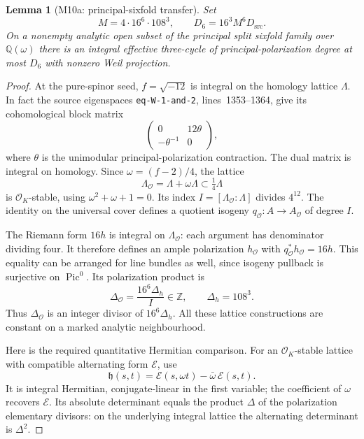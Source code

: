 \documentclass[11pt,a4paper]{article}
\newtheorem{lemma}[theorem]{Lemma}
\theoremstyle{definition}\newtheorem{definition}[theorem]{Definition}
\theoremstyle{remark}\newtheorem{remark}[theorem]{Remark}
\newcommand{\Q}{\mathbb Q}\newcommand{\Z}{\mathbb Z}\newcommand{\C}{\mathbb C}\newcommand{\R}{\mathbb R}
\newcommand{\cO}{\mathcal O}\newcommand{\CH}{\operatorname{CH}}\newcommand{\cl}{\operatorname{cl}}
\begin{document}
\begin{lemma}[M10a: principal-sixfold transfer]\label{M10a}
Set
\[
 M=4\cdot16^6\cdot108^3,\qquad
 D_6=16^3M^6D_{\mathrm{src}}.
\]
On a nonempty analytic open subset of the principal split sixfold
family over $\Q(\omega)$ there is an integral effective three-cycle
of principal-polarization degree at most $D_6$ with nonzero Weil
projection.
\end{lemma}
\begin{proof}
At the pure-spinor seed, $f=\sqrt{-12}$ is integral on the homology
lattice $\Lambda$. In fact the source eigenspaces
\texttt{eq-W-1-and-2}, lines~1353--1364, give its cohomological
block matrix
\[
 \begin{pmatrix}0&12\theta\\-\theta^{-1}&0\end{pmatrix},
\]
where $\theta$ is the unimodular principal-polarization contraction.
The dual matrix is integral on homology. Since
$\omega=(f-2)/4$, the lattice
\[
 \Lambda_{\cO}=\Lambda+\omega\Lambda
 \subset\tfrac14\Lambda
\]
is $\cO_K$-stable, using $\omega^2+\omega+1=0$.
Its index $I=[\Lambda_{\cO}:\Lambda]$ divides $4^{12}$.
The identity on the universal cover defines a quotient isogeny
$q_{\cO}:A\to A_{\cO}$ of degree $I$.

The Riemann form $16h$ is integral on $\Lambda_{\cO}$: each argument
has denominator dividing four. It therefore defines an ample
polarization $h_{\cO}$ with
$q_{\cO}^*h_{\cO}=16h$. This equality can be arranged for line
bundles as well, since isogeny pullback is surjective on
$\operatorname{Pic}^0$. Its polarization product is
\[
 \Delta_{\cO}=\frac{16^6\Delta_h}{I}\in\Z,
 \qquad \Delta_h=108^3.
\]
Thus $\Delta_{\cO}$ is an integer divisor of $16^6\Delta_h$.
All these lattice constructions are constant on a marked analytic
neighbourhood.

Here is the required quantitative Hermitian comparison.
For an $\cO_K$-stable lattice with compatible alternating form
$\mathcal E$, use
\[
 \mathfrak h(s,t)=\mathcal E(s,\omega t)
                         -\bar\omega\,\mathcal E(s,t).
\]
It is integral Hermitian, conjugate-linear in the first variable;
the coefficient of $\omega$ recovers $\mathcal E$.
Its absolute determinant equals the product $\Delta$ of the
polarization elementary divisors: on the underlying integral lattice
the alternating determinant is $\Delta^2$.


\end{proof}
\end{document}
